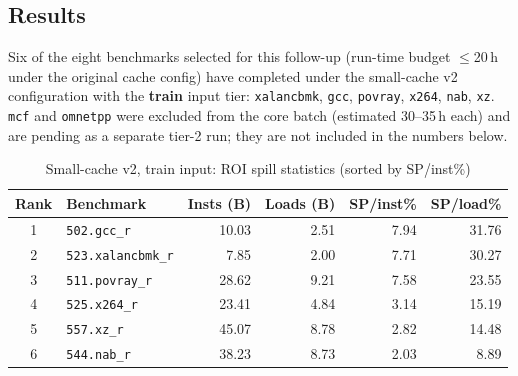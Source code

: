 \documentclass[11pt,a4paper]{article}
\begin{document}
\subsection{Results}

Six of the eight benchmarks selected for this follow-up
(run-time budget $\leq$20\,h under the original cache config) have
completed under the small-cache v2 configuration with the \textbf{train}
input tier: \texttt{xalancbmk}, \texttt{gcc}, \texttt{povray},
\texttt{x264}, \texttt{nab}, \texttt{xz}. \texttt{mcf} and
\texttt{omnetpp} were excluded from the core batch (estimated
30--35\,h each) and are pending as a separate tier-2 run; they are not
included in the numbers below.

\begin{table}[H]
\centering
\caption{Small-cache v2, train input: ROI spill statistics (sorted by SP/inst\%)}
\label{tab:sc_v2_spill}
\small
\begin{tabular}{clrrrr}
\toprule
\textbf{Rank} & \textbf{Benchmark} & \textbf{Insts (B)} & \textbf{Loads (B)} &
\textbf{SP/inst\%} & \textbf{SP/load\%} \\
\midrule
1 & \texttt{502.gcc\_r}       & 10.03 & 2.51 & 7.94 & 31.76 \\
2 & \texttt{523.xalancbmk\_r} &  7.85 & 2.00 & 7.71 & 30.27 \\
3 & \texttt{511.povray\_r}    & 28.62 & 9.21 & 7.58 & 23.55 \\
4 & \texttt{525.x264\_r}      & 23.41 & 4.84 & 3.14 & 15.19 \\
5 & \texttt{557.xz\_r}        & 45.07 & 8.78 & 2.82 & 14.48 \\
6 & \texttt{544.nab\_r}       & 38.23 & 8.73 & 2.03 &  8.89 \\
\bottomrule
\end{tabular}
\end{table}
\end{document}
